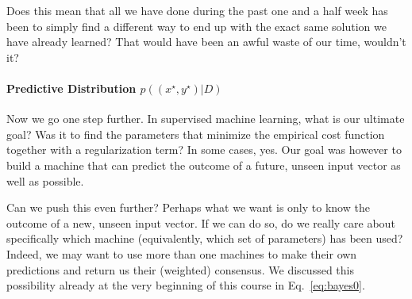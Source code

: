 \documentclass{report}
\begin{document}
Does this mean that all we have done during the past one and a half week has
been to simply find a different way to end up with the exact same solution we
have already learned? That would have been an awful waste of our time, wouldn't
it?


\paragraph{Predictive Distribution $p((x^\star, y^\star)|D)$}

Now we go one step further. In supervised machine learning, what is our ultimate
goal? Was it to find the parameters that minimize the empirical cost function
together with a regularization term? In some cases, yes.  Our goal was however
to build a machine that can predict the outcome of a future, unseen input vector
as well as possible. 

Can we push this even further? Perhaps what we want is only to know the outcome
of a new, unseen input vector. If we can do so, do we really care about
specifically which machine (equivalently, which set of parameters) has been
used? Indeed, we may want to use more than one machines to make their own
predictions and return us their (weighted) consensus. We discussed this
possibility already at the very beginning of this course in
Eq.~\eqref{eq:bayes0}. 
\end{document}
